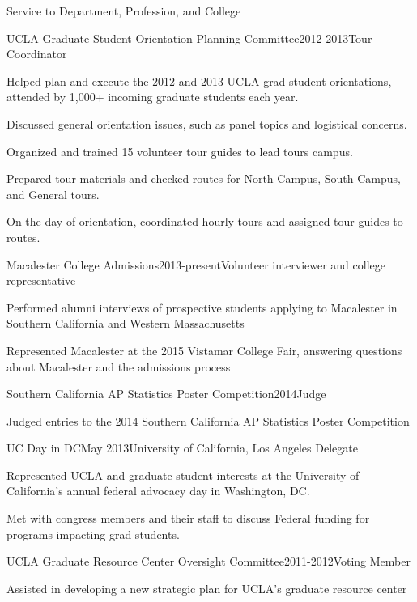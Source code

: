 \documentclass{resume} %
\begin{document}
\begin{rSection}{Service to Department, Profession, and College}
\begin{rSubsection}{UCLA Graduate Student Orientation Planning Committee}{}{2012-2013}{Tour Coordinator}
\item Helped plan and execute the 2012 and 2013 UCLA grad student orientations, attended by 1,000+ incoming graduate students each year. 
\item Discussed general orientation issues, such as panel topics and logistical concerns.
\item Organized and trained 15 volunteer tour guides to lead tours campus.
\item Prepared tour materials and checked routes for North Campus, South Campus, and General tours.
\item On the day of orientation, coordinated hourly tours and assigned tour guides to routes.
\end{rSubsection}

\begin{rSubsection}{Macalester College Admissions}{}{2013-present}{Volunteer interviewer and college representative}
\item Performed alumni interviews of prospective students applying to Macalester in Southern California and Western Massachusetts 
\item Represented Macalester at the 2015 Vistamar College Fair, answering questions about Macalester and the admissions process
\end{rSubsection}

\begin{rSubsection}{Southern California AP Statistics Poster Competition}{}{2014}{Judge}
\item Judged entries to the 2014 Southern California AP Statistics Poster Competition
\end{rSubsection}

\begin{rSubsection}{UC Day in DC}{}{May 2013}{University of California, Los Angeles Delegate}
\item Represented UCLA and graduate student interests at the University of California's annual federal advocacy day in Washington, DC. 
\item Met with congress members and their staff to discuss Federal funding for programs impacting grad students. 
\end{rSubsection}

\begin{rSubsection}{UCLA Graduate Resource Center Oversight Committee}{}{2011-2012}{Voting Member}
\item Assisted in developing a new strategic plan for UCLA's graduate resource center
\end{rSubsection}



\end{rSection}
\end{document}
